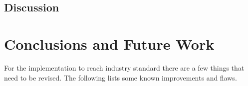 \documentclass[a4paper,11pt]{article}
\numberwithin{equation}{section}
\begin{document}










\subsection{Discussion}
\label{evaluation:discussion}



\section{Conclusions and Future Work}
\label{conclusions}

For the implementation to reach industry standard there
are a few things that need to be revised. The following lists some known
improvements and flaws.
\end{document}
